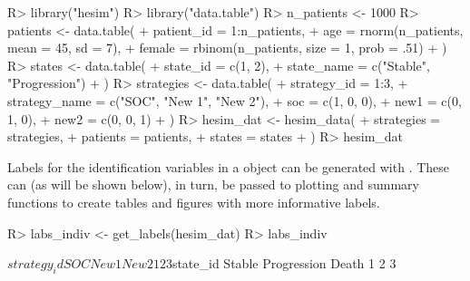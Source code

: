 \documentclass[article, nojss]{jss}\usepackage[]{graphicx}\usepackage[]{color}
\begin{document}
\begin{Schunk}
\begin{Sinput}
R> library("hesim")
R> library("data.table")
R> n_patients <- 1000
R> patients <- data.table(
+    patient_id = 1:n_patients,
+    age = rnorm(n_patients, mean = 45, sd = 7),
+    female = rbinom(n_patients, size = 1, prob = .51)
+  )
R> states <- data.table(
+    state_id = c(1, 2),
+    state_name = c("Stable", "Progression") 
+  )
R> strategies <- data.table(
+    strategy_id = 1:3,
+    strategy_name = c("SOC", "New 1", "New 2"),
+    soc = c(1, 0, 0),
+    new1 = c(0, 1, 0),
+    new2 = c(0, 0, 1)
+  )
R> hesim_dat <- hesim_data(
+    strategies = strategies,
+    patients = patients,
+    states = states
+  )
R> hesim_dat
\end{Sinput}
\end{Schunk}

Labels for the identification variables in a  object can be generated with . These can (as will be shown below), in turn, be passed to plotting and summary functions to create tables and figures with more informative labels. 

\begin{Schunk}
\begin{Sinput}
R> labs_indiv <- get_labels(hesim_dat)
R> labs_indiv
\end{Sinput}
\begin{Soutput}
$strategy_id
  SOC New 1 New 2 
    1     2     3 

$state_id
     Stable Progression       Death 
          1           2           3 
\end{Soutput}
\end{Schunk}
\end{document}
